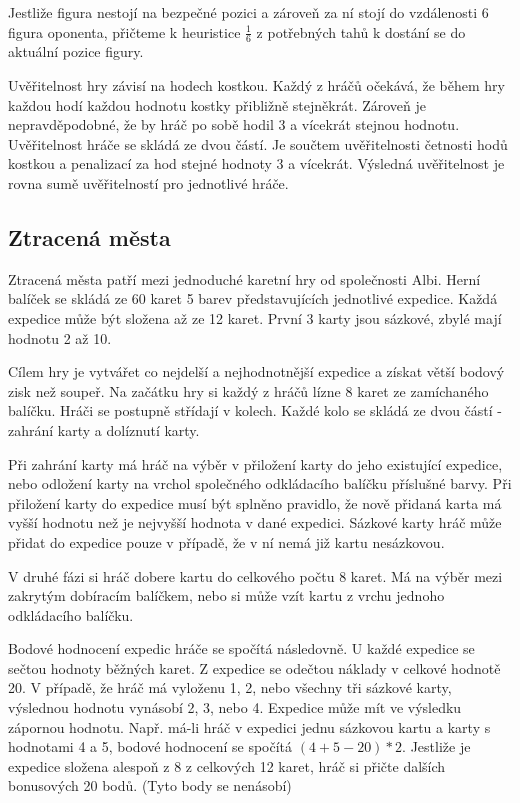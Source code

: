 Jestliže figura nestojí na bezpečné pozici a zároveň za ní stojí do vzdálenosti 6 figura oponenta, přičteme k heuristice $\frac{1}{6}$ z potřebných tahů k dostání se do aktuální pozice figury.

Uvěřitelnost hry závisí na hodech kostkou. Každý z hráčů očekává, že během hry každou hodí každou hodnotu kostky přibližně stejněkrát. Zároveň je nepravděpodobné, že by hráč po sobě hodil 3 a vícekrát stejnou hodnotu. Uvěřitelnost hráče se skládá ze dvou částí. Je součtem uvěřitelnosti četnosti hodů kostkou a penalizací za hod stejné hodnoty 3 a vícekrát. Výsledná uvěřitelnost je rovna sumě uvěřitelností pro jednotlivé hráče.

\subsection{Ztracená města}

Ztracená města patří mezi jednoduché karetní hry od společnosti Albi. Herní balíček se skládá ze 60 karet 5 barev představujících jednotlivé expedice. Každá expedice může být složena až ze 12 karet. První 3 karty jsou sázkové, zbylé mají hodnotu 2 až 10. 

Cílem hry je vytvářet co nejdelší a nejhodnotnější expedice a získat větší bodový zisk než soupeř. Na začátku hry si každý z hráčů lízne 8 karet ze zamíchaného balíčku. Hráči se postupně střídají v kolech. Každé kolo se skládá ze dvou částí - zahrání karty a dolíznutí karty. 

Při zahrání karty má hráč na výběr v přiložení karty do jeho existující expedice, nebo odložení karty na vrchol společného odkládacího balíčku příslušné barvy. Při přiložení karty do expedice musí být splněno pravidlo, že nově přidaná karta má vyšší hodnotu než je nejvyšší hodnota v dané expedici. Sázkové karty hráč může přidat do expedice pouze v případě, že v ní nemá již kartu nesázkovou. 

V druhé fázi si hráč dobere kartu do celkového počtu 8 karet. Má na výběr mezi zakrytým dobíracím balíčkem, nebo si může vzít kartu z vrchu jednoho odkládacího balíčku.

Bodové hodnocení expedic hráče se spočítá následovně. U každé expedice se sečtou hodnoty běžných karet. Z expedice se odečtou náklady v celkové hodnotě 20. V případě, že hráč má vyloženu 1, 2, nebo všechny tři sázkové karty, výslednou hodnotu vynásobí 2, 3, nebo 4. Expedice může mít ve výsledku zápornou hodnotu. Např. má-li hráč v expedici jednu sázkovou kartu a karty s hodnotami 4 a 5, bodové hodnocení se spočítá $(4 + 5 - 20) * 2$. Jestliže je expedice složena alespoň z 8 z celkových 12 karet, hráč si přičte dalších bonusových 20 bodů. (Tyto body se nenásobí)

